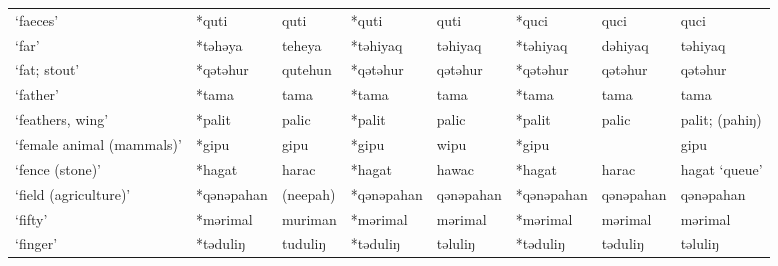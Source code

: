 \begin{landscape}
\begin{longtable}[c]{@{}p{3cm}<{\raggedright}p{2.75cm}<{\raggedright}p{2.75cm}<{\raggedright}p{2.75cm}<{\raggedright}p{2.75cm}<{\raggedright}p{2.75cm}<{\raggedright}p{2.75cm}<{\raggedright}p{2.75cm}<{\raggedright}@{}}
`faeces'                                             & *quti        & quti                          & *quti          & quti                       & *quci            & quci                     & quci                              \\
`far'                                                & *təhəya      & teheya                        & *təhiyaq       & təhiyaq                    & *təhiyaq         & dəhiyaq                  & təhiyaq                           \\
`fat; stout'                                         & *qətəhur     & qutehun                       & *qətəhur       & qətəhur                    & *qətəhur         & qətəhur                  & qətəhur                           \\
`father'                                             & *tama        & tama                          & *tama          & tama                       & *tama            & tama                     & tama                              \\
`feathers, wing'                                     & *palit       & palic                         & *palit         & palic                      & *palit           & palic                    & palit; (pahiŋ)                    \\
`female animal (mammals)'                            & *gipu        & gipu                          & *gipu          & wipu                       & *gipu            &                          & gipu                              \\
`fence (stone)'                                      & *hagat       & harac                         & *hagat         & hawac                      & *hagat           & harac                    & hagat `queue'                     \\
`field (agriculture)'                                & *qənəpahan   & (neepah)                      & *qənəpahan     & qənəpahan                  & *qənəpahan       & qənəpahan                & qənəpahan                         \\
`fifty'                                              & *mərimal     & muriman                       & *mərimal       & mərimal                    & *mərimal         & mərimal                  & mərimal                           \\
`finger'                                             & *təduliŋ     & tuduliŋ                       & *təduliŋ       & təluliŋ                    & *təduliŋ         & təduliŋ                  & təluliŋ                           \\

\end{longtable}
\end{landscape}
